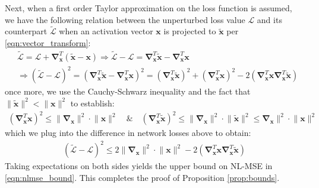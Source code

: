 \documentclass{article}
\theoremstyle{plain}
\begin{document}
Next, when a first order Taylor approximation on the loss function is assumed, we have the following relation between the unperturbed loss value $\mathcal{L}$ and its counterpart $\tilde{\mathcal{L}}$ when an activation vector $\mathbf{x}$ is projected to $\tilde{\mathbf{x}}$ per \eqref{eqn:vector_transform}:
\begin{align*}
    &\tilde{\mathcal{L}} = \mathcal{L} + \mathbf{\nabla}_{\mathbf{x}}^T\left(\tilde{\mathbf{x}}-\mathbf{x}\right) \Rightarrow \tilde{\mathcal{L}} - \mathcal{L} = \mathbf{\nabla}_{\mathbf{x}}^T\tilde{\mathbf{x}} - \mathbf{\nabla}_{\mathbf{x}}^T\mathbf{x}\\
    &\Rightarrow \left(\tilde{\mathcal{L}} - \mathcal{L}\right)^2 = \left(\mathbf{\nabla}_{\mathbf{x}}^T\tilde{\mathbf{x}} - \mathbf{\nabla}_{\mathbf{x}}^T\mathbf{x}\right)^2 = \left(\mathbf{\nabla}_{\mathbf{x}}^T\tilde{\mathbf{x}}\right)^2 + \left(\mathbf{\nabla}_{\mathbf{x}}^T\mathbf{x}\right)^2 -2\left(\mathbf{\nabla}_{\mathbf{x}}^T\mathbf{x}\mathbf{\nabla}_{\mathbf{x}}^T\tilde{\mathbf{x}}\right)
\end{align*}
once more, we use the Cauchy-Schwarz inequality and the fact that $\lVert \tilde{\mathbf{x}} \rVert^2<\lVert \mathbf{x} \rVert^2$ to establish:
\begin{align*}
    \left(\mathbf{\nabla}_{\mathbf{x}}^T\mathbf{x}\right)^2 \leq \lVert \mathbf{\nabla}_{\mathbf{x}}\rVert^2\cdot\lVert\mathbf{x} \rVert^2 \quad\&\quad \left(\mathbf{\nabla}_{\mathbf{x}}^T\tilde{\mathbf{x}}\right)^2 \leq \lVert \mathbf{\nabla}_{\mathbf{x}}\rVert^2\cdot\lVert\tilde{\mathbf{x}}\rVert^2\leq \mathbf{\nabla}_{\mathbf{x}}\rVert^2\cdot\lVert\mathbf{x} \rVert^2
\end{align*}
which we plug into the difference in network losses above to obtain:
\begin{align*}
    \left(\tilde{\mathcal{L}} - \mathcal{L}\right)^2 \leq 2\lVert\mathbf{\nabla}_{\mathbf{x}}\rVert^2\cdot\lVert\mathbf{x} \rVert^2-2\left(\mathbf{\nabla}_{\mathbf{x}}^T\mathbf{x}\mathbf{\nabla}_{\mathbf{x}}^T\tilde{\mathbf{x}}\right)
\end{align*}
Taking expectations on both sides yields the upper bound on NL-MSE in \eqref{eqn:nlmse_bound}. This completes the proof of Proposition \ref{prop:bounds}.
\end{document}
